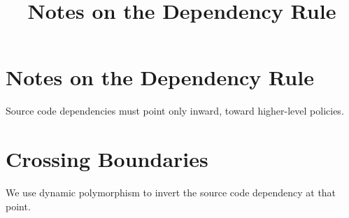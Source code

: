 \documentclass{article}
\title{Notes on the Dependency Rule}
\begin{document}
\maketitle
\section{Notes on the Dependency Rule}
Source code dependencies must point only inward, toward higher-level policies.
\section{Crossing Boundaries}
We use dynamic polymorphism to invert the source code dependency at that point.
\end{document}
